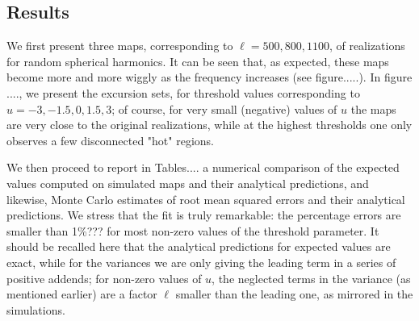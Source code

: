 \documentclass[aps,prd,showpacs,superscriptaddress,groupedaddress]{revtex4-1}  %
\begin{document}


\subsection*{Results}

We first present three maps, corresponding to $\ell=500,800,1100$, of realizations for random spherical harmonics. It can be seen that, as expected, these maps become more and more wiggly as the frequency increases (see figure.....). In figure ...., we present the excursion sets, for threshold values corresponding to $u=-3,-1.5,0,1.5,3$; of course, for very small (negative) values of $u$ the maps are very close to the original realizations, while at the highest thresholds one only observes a few disconnected "hot" regions.

We then proceed to report in Tables.... a numerical comparison of the expected values computed on simulated maps and their analytical predictions, and likewise, Monte Carlo estimates of root mean squared errors and their analytical predictions. We stress that the fit is truly remarkable: the percentage errors are smaller than 1\%??? for most non-zero values of the threshold parameter. It should be recalled here that the analytical predictions for expected values are exact, while for the variances we are only giving the leading term in a series of positive addends; for non-zero values of $u$, the neglected terms in the variance (as mentioned earlier) are a factor $\ell$ smaller than the leading one, as mirrored in the simulations. 
\end{document}

